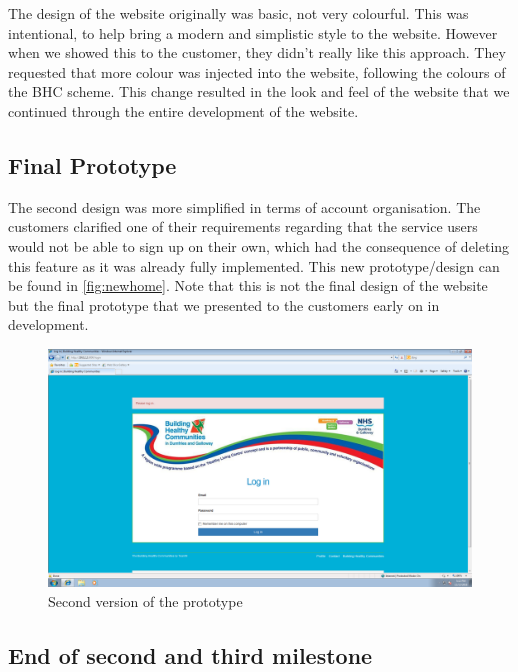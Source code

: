 \documentclass{l3proj}
\begin{document}
The design of the website originally was basic, not very colourful. This was intentional, to help bring a modern and simplistic style to the website. However when we showed this to the customer, they didn't really like this approach. They requested that more colour was injected into the website, following the colours of the BHC scheme. This change resulted in the look and feel of the website that we continued through the entire development of the website.

\subsection{Final Prototype}
\label{sec:prototype2}

The second design was more simplified in terms of account organisation. The customers clarified one of their requirements regarding that the service users would not be able to sign up on their own, which had the consequence of deleting this feature as it was already fully implemented. This new prototype/design can be found in \autoref{fig:newhome}. Note that this is not the final design of the website but the final prototype that we presented to the customers early on in development.


\begin{figure}[ht]
\centerline{\includegraphics[width=\textwidth, height=\textheight, keepaspectratio]{newhome.png}}
\caption{Second version of the prototype}
\label{fig:newhome}
\end{figure}

\subsection{End of second and third milestone}
\label{sec:milestone23}
\end{document}
